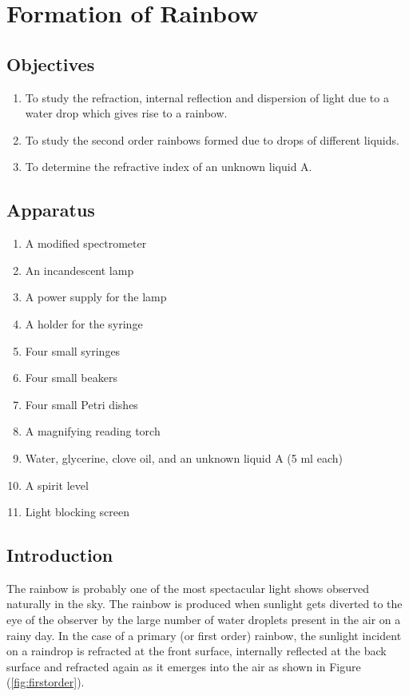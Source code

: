 \chapter{Formation of Rainbow}

\section*{Objectives}

\begin{enumerate}
\item To study the refraction, internal reflection and dispersion of light due to a water drop which gives rise to a rainbow.
\item To study the second order rainbows formed due to drops of different liquids. 
\item To determine the refractive index of an unknown liquid A.
\end{enumerate}

\section*{Apparatus}

\begin{enumerate}
\item A modified spectrometer 
\item An incandescent lamp
\item A power supply for the lamp
\item A holder for the syringe 
\item Four small syringes 
\item Four small beakers 
\item Four small Petri dishes 
\item A magnifying reading torch 
\item Water, glycerine, clove oil, and an unknown liquid A (5 ml each)
\item A spirit level 
\item Light blocking screen
\end{enumerate}

\section*{Introduction}
The rainbow is probably one of the most spectacular light shows observed naturally in the sky. The rainbow is produced when sunlight gets diverted to the eye of the observer by the large number of water droplets present in the air on a rainy day. In the case of a primary (or first order) rainbow, the sunlight incident on a raindrop is refracted at the front surface, internally reflected at the back surface and refracted again as it emerges into the air as shown in Figure (\ref{fig:firstorder}). 

